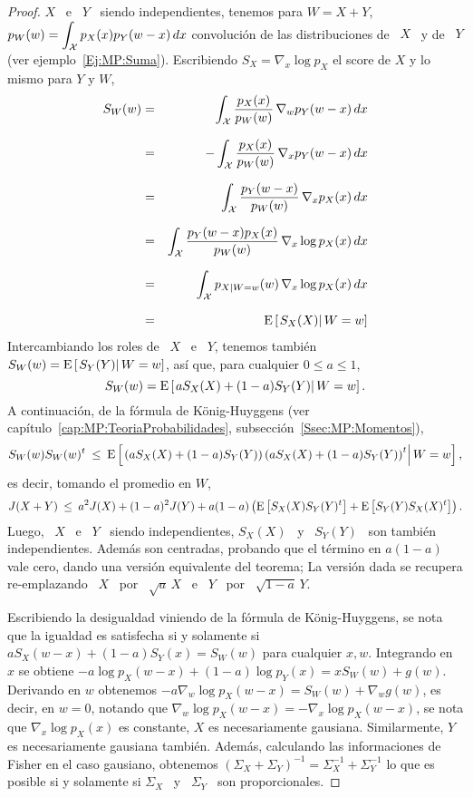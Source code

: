 \begin{proof}
  $X$  \  e  \  $Y$  \  siendo  independientes,  tenemos  para  $W  =  X  +  Y$,
  $\displaystyle p_W(w)  = \int_{\mathcal{X}} p_X(x)  p_Y(w-x) \, dx$ convoluci\'on  de las
  distribuciones de \ $X$ \ y de \ $Y$ (ver ejemplo~\ref{Ej:MP:Suma}).
  Escribiendo $S_X =  \nabla_x \log p_X$ el score  de $X$ y lo mismo  para $Y$ y
  $W$,
  \begin{eqnarray*}
  S_W(w) & = & \int_{\mathcal{X}} \frac{p_X(x)}{p_W(w)} \, \nabla_w p_Y(w-x) \, dx\\[2.5mm]
  & = & - \int_{\mathcal{X}} \frac{p_X(x)}{p_W(w)} \, \nabla_x p_Y(w-x) \, dx\\[2.5mm]
  & = & \int_{\mathcal{X}} \frac{p_Y(w-x)}{p_W(w)} \, \nabla_x p_X(x) \, dx\\[2.5mm]
  & = & \int_{\mathcal{X}} \frac{p_Y(w-x) p_X(x)}{p_W(w)} \, \nabla_x \log p_X(x) \, dx\\[2.5mm]
  & = & \int_{\mathcal{X}} p_{X|W=w}(w) \, \nabla_x \log p_X(x) \, dx\\[2.5mm]
  & = & \operatorname{E}\left[ \left. S_X(X) \right| W = w \right]
  \end{eqnarray*}
  Intercambiando  los roles de  \ $X$  \ e  \ $Y$,  tenemos tambi\'en  $S_W(w) =
  \operatorname{E}\left[ \left. S_Y(Y) \right| W =  w \right]$, as\'i que, para cualquier $0
  \le a \le 1$,
  \[
  S_W(w) = \operatorname{E}\left[ \left. a S_X(X) + (1-a) S_Y(Y) \right| W = w \right].
  \]
  A    continuaci\'on,    de     la    f\'ormula    de    K\"onig-Huyggens    (ver
  cap\'itulo~\ref{cap:MP:TeoriaProbabilidades},
  subsecci\'on~\ref{Ssec:MP:Momentos}),
  \[
  S_W(w) S_W(w)^t \: \le \:  \operatorname{E}\left[ \left. \left(a S_X(X) + (1-a) S_Y(Y)
      \right) \left(a S_X(X) + (1-a) S_Y(Y) \right)^t \right| W = w \right],
  \]
  es decir, tomando el promedio en $W$,
  \[
  J(X+Y) \: \le  \: a^2 J(X) + (1-a)^2 J(Y) +  a (1-a) \left( \operatorname{E}\left[
      S_X(X) S_Y(Y)^t \right] + \operatorname{E}\left[ S_Y(Y) S_X(X)^t \right] \right).
  \]
  Luego, \ $X$ \ e \ $Y$ \  siendo independientes, $S_X(X)$ \ y \ $S_Y(Y)$ \ son
  tambi\'en independientes. Adem\'as son centradas, probando que el t\'ermino en
  $a  (1-a)$ vale  cero, dando  una  versi\'on equivalente  del teorema;  La
  versi\'on dada se recupera re-emplazando \ $X$ \ por \ $\sqrt{a} \, X$ \ e \
  $Y$ \ por \ $\sqrt{1-a} \, Y$.

  Escribiendo la desigualdad viniendo de la f\'ormula de K\"onig-Huyggens, se nota
  que la igualdad es  satisfecha si y solamente si $a S_X(w-x)  + (1-a) S_Y(x) =
  S_W(w)$ para cualquier $x, w$. Integrando  en $x$ se obtiene $-a \log p_X(w-x)
  +  (1-a) \log  p_Y(x) =  x S_W(w)  + g(w)$.   Derivando en  $w$  obtenemos $-a
  \nabla_w  \log p_X(w-x)  = S_W(w)  + \nabla_w  g(w)$, es  decir, en  $w  = 0$,
  notando que  $\nabla_w \log p_X(w-x) =  -\nabla_x \log p_X(w-x)$,  se nota que
  $\nabla_x  \log p_X(x)$  es  constante, \ie  $X$  es necesariamente  gausiana.
  Similarmente, $Y$  es necesariamente gausiana  tambi\'en. Adem\'as, calculando
  las informaciones de Fisher en  el caso gausiano, obtenemos $\left( \Sigma_X +
    \Sigma_Y \right)^{-1} = \Sigma_X^{-1} +  \Sigma_Y^{-1}$ lo que es posible si
  y solamente si $\Sigma_X$ \ y \ $\Sigma_Y$ \ son proporcionales.
\end{proof}
